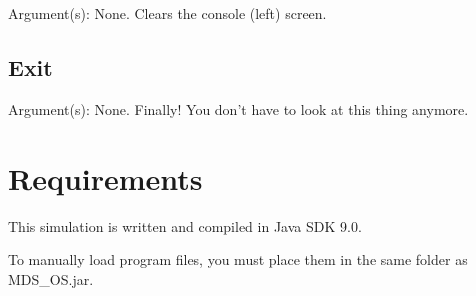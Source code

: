 \documentclass[10pt]{article}
\begin{document}
Argument(s): None. Clears the console (left) screen.

\subsection{Exit}

Argument(s): None. Finally! You don't have to look at this thing anymore.

\section{Requirements}

This simulation is written and compiled in Java SDK 9.0.

To manually load program files, you must place them in the same folder as MDS\_OS.jar.
\end{document}
